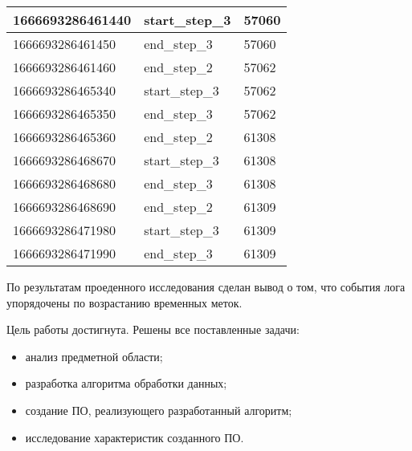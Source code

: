 \begin{longtable}{|p{}|p{}|p{}|}
    1666693286461440   & start\_step\_3   & 57060     \\ \hline
    1666693286461450   & end\_step\_3    & 57060     \\ \hline
    1666693286461460   & end\_step\_2      & 57062     \\ \hline
    1666693286465340   & start\_step\_3   & 57062     \\ \hline
    1666693286465350   & end\_step\_3    & 57062     \\ \hline
    1666693286465360   & end\_step\_2      & 61308     \\ \hline
    1666693286468670   & start\_step\_3   & 61308     \\ \hline
    1666693286468680   & end\_step\_3    & 61308     \\ \hline
    1666693286468690   & end\_step\_2      & 61309     \\ \hline
    1666693286471980   & start\_step\_3      & 61309     \\ \hline
    1666693286471990   & end\_step\_3      & 61309     \\ \hline
\end{longtable}

По результатам проеденного исследования сделан вывод о том, что события лога упорядочены по возрастанию временных меток. 


Цель работы достигнута. Решены все поставленные задачи: 
\begin{itemize}
    \item анализ предметной области;
    \item разработка алгоритма обработки данных;
    \item создание ПО, реализующего разработанный алгоритм;
    \item исследование характеристик созданного ПО.
\end{itemize}
